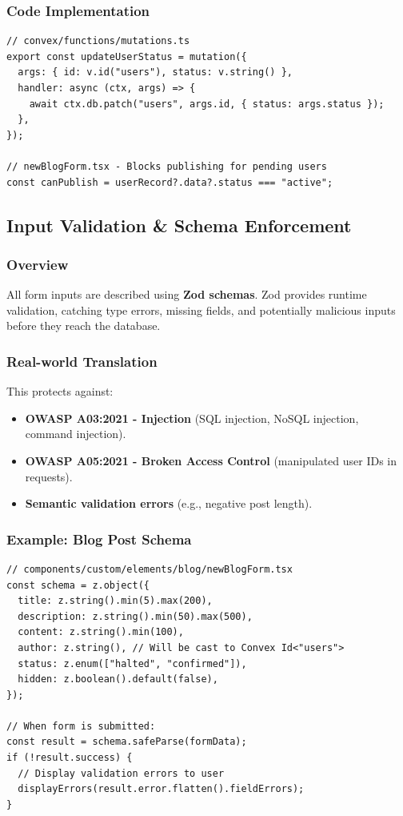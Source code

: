 \documentclass[11pt,a4paper]{article}
\begin{document}
\subsubsection{Code Implementation}
\begin{lstlisting}
// convex/functions/mutations.ts
export const updateUserStatus = mutation({
  args: { id: v.id("users"), status: v.string() },
  handler: async (ctx, args) => {
    await ctx.db.patch("users", args.id, { status: args.status });
  },
});

// newBlogForm.tsx - Blocks publishing for pending users
const canPublish = userRecord?.data?.status === "active";
\end{lstlisting}

\subsection{Input Validation \& Schema Enforcement}

\subsubsection{Overview}
All form inputs are described using \textbf{Zod schemas}. Zod provides runtime validation, catching type errors, missing fields, and potentially malicious inputs before they reach the database.

\subsubsection{Real-world Translation}
This protects against:
\begin{itemize}
    \item \textbf{OWASP A03:2021 - Injection} (SQL injection, NoSQL injection, command injection).
    \item \textbf{OWASP A05:2021 - Broken Access Control} (manipulated user IDs in requests).
    \item \textbf{Semantic validation errors} (e.g., negative post length).
\end{itemize}

\subsubsection{Example: Blog Post Schema}
\begin{lstlisting}
// components/custom/elements/blog/newBlogForm.tsx
const schema = z.object({
  title: z.string().min(5).max(200),
  description: z.string().min(50).max(500),
  content: z.string().min(100),
  author: z.string(), // Will be cast to Convex Id<"users">
  status: z.enum(["halted", "confirmed"]),
  hidden: z.boolean().default(false),
});

// When form is submitted:
const result = schema.safeParse(formData);
if (!result.success) {
  // Display validation errors to user
  displayErrors(result.error.flatten().fieldErrors);
}
\end{lstlisting}
\end{document}
